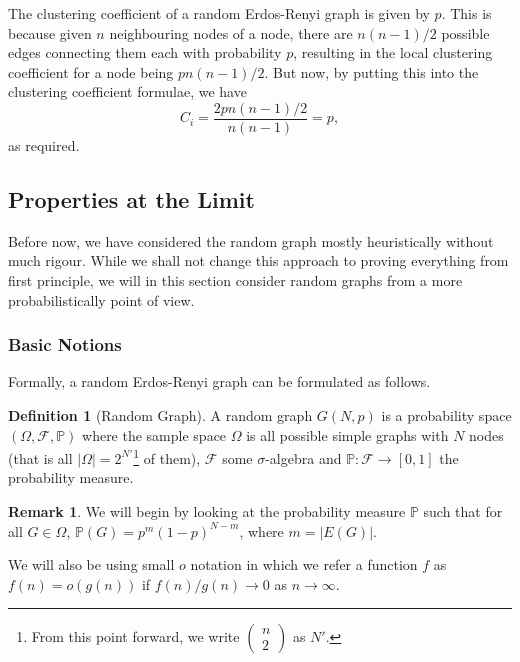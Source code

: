 \documentclass[
]{article}
\theoremstyle{definition}
\newtheorem*{remark}{Remark}
\theoremstyle{definition}
\newtheorem{definition}{Definition}[section]
\begin{document}
The clustering coefficient of a random Erdos-Renyi graph is given by
\(p\). This is because given \(n\) neighbouring nodes of a node, there
are \(n (n - 1) / 2\) possible edges connecting them each with
probability \(p\), resulting in the local clustering coefficient for a
node being \(p n (n - 1) / 2\). But now, by putting this into the
clustering coefficient formulae, we have
\[C_i = \frac{2 p n (n - 1) / 2}{n (n - 1)} = p,\] as required.

\hypertarget{properties-at-the-limit}{%
\subsection{Properties at the Limit}\label{properties-at-the-limit}}

Before now, we have considered the random graph mostly heuristically
without much rigour. While we shall not change this approach to proving
everything from first principle, we will in this section consider random
graphs from a more probabilistically point of view.

\hypertarget{basic-notions}{%
\subsubsection{Basic Notions}\label{basic-notions}}

Formally, a random Erdos-Renyi graph can be formulated as follows.

\begin{definition}[Random Graph]
  A random graph \(G(N, p)\) is a probability space \((\Omega, \mathcal{F}, \mathbb{P})\) 
  where the sample space \(\Omega\) is all possible simple graphs with \(N\) 
  nodes (that is all \(\left| \Omega \right| = 2^{N'}\)\footnote{From this point 
  forward, we write \(\begin{pmatrix} n \\ 2 \end{pmatrix}\) as \(N'\).} of them), 
  \(\mathcal{F}\) some \(\sigma\)-algebra and \(\mathbb{P} : \mathcal{F} \to [0, 1]\) 
  the probability measure. 
\end{definition}

\begin{remark}
  We will begin by looking at the probability measure \(\mathbb{P}\) such that 
  for all \(G \in \Omega\), \(\mathbb{P}(G) = p^m (1 - p)^{N - m}\), where 
  \(m = \left| E(G) \right|\).
\end{remark}

We will also be using small \(o\) notation in which we refer a function
\(f\) as \(f(n) = o(g(n))\) if \(f(n) / g(n) \to 0\) as
\(n \to \infty\).
\end{document}
